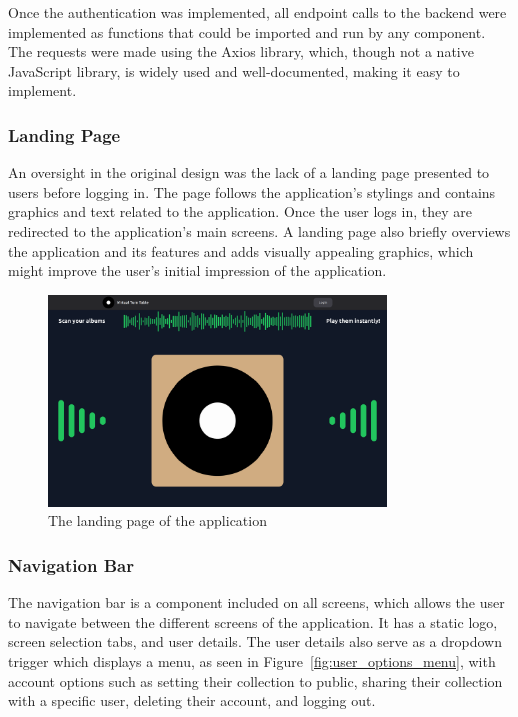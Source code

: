Once the authentication was implemented, all endpoint calls to the backend were implemented as functions that could be imported and run by any component. The requests were made using the Axios library, which, though not a native JavaScript library, is widely used and well-documented, making it easy to implement.

\subsubsection{Landing Page}
An oversight in the original design was the lack of a landing page presented to users before logging in. The page follows the application's stylings and contains graphics and text related to the application. Once the user logs in, they are redirected to the application's main screens. A landing page also briefly overviews the application and its features and adds visually appealing graphics, which might improve the user's initial impression of the application.

\begin{figure} [H]
    \centering
    \includegraphics[width=0.8\textwidth]{figures/landing_page.png}
    \caption{The landing page of the application}
    \label{fig:landing_page}
\end{figure}

\subsubsection{Navigation Bar}
The navigation bar is a component included on all screens, which allows the user to navigate between the different screens of the application. It has a static logo, screen selection tabs, and user details. The user details also serve as a dropdown trigger which displays a menu, as seen in Figure~\ref{fig:user_options_menu}, with account options such as setting their collection to public, sharing their collection with a specific user, deleting their account, and logging out.

